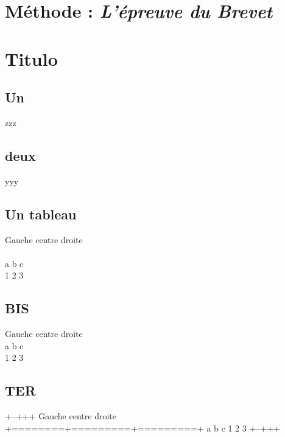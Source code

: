 \documentclass[a4paper,]{article}
\date{}
\begin{document}
\section{\texorpdfstring{Méthode : \emph{L'épreuve du
Brevet}}{Méthode : L'épreuve du Brevet}}\label{muxe9thode-luxe9preuve-du-brevet}

\section{Titulo}\label{titulo}

\subsection{Un}\label{un}

zzz

\subsection{deux}\label{deux}

yyy

\subsection{Un tableau}\label{un-tableau}

Gauche \textbar{} centre \textbar{} droite \textbar{}\\
\hspace*{0.333em}\textbar{} \textbar{} \textbar{}\\
a \textbar{} b \textbar{} c \textbar{}\\
1 \textbar{} 2 \textbar{} 3 \textbar{}

\subsection{BIS}\label{bis}

Gauche \textbar{} centre \textbar{} droite \textbar{} \textbar{}\\
a \textbar{} b \textbar{} c\\
1 \textbar{} 2 \textbar{} 3

\subsection{TER}\label{ter}

+--+++ \textbar{} Gauche \textbar{} centre \textbar{} droite \textbar{}
+========+=========+=========+ \textbar{} a \textbar{} b \textbar{} c
\textbar{} \textbar{} 1 \textbar{} 2 \textbar{} 3 \textbar{} +--+++
\end{document}
